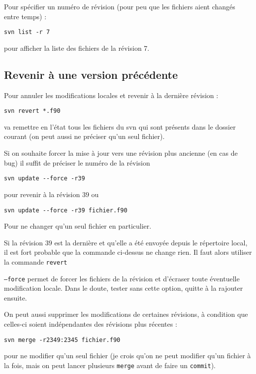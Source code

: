 \documentclass[a4paper,twoside]{article}
\begin{document}
Pour spécifier un numéro de révision (pour peu que les fichiers aient changés entre temps) : 
\begin{verbatim}
svn list -r 7
\end{verbatim}
pour afficher la liste des fichiers de la révision 7.

\subsection{Revenir à une version précédente} 
Pour annuler les modifications locales et revenir à la dernière révision : 
\begin{verbatim}
svn revert *.f90
\end{verbatim}
va remettre en l'état tous les fichiers du svn qui sont présents dans le dossier courant (on peut aussi ne préciser qu'un seul fichier).

\bigskip

Si on souhaite forcer la mise à jour vers une révision plus ancienne (en cas de bug) il suffit de préciser le numéro de la révision
\begin{verbatim}
svn update --force -r39
\end{verbatim}
pour revenir à la révision $39$ ou 
\begin{verbatim}
svn update --force -r39 fichier.f90
\end{verbatim}
Pour ne changer qu'un seul fichier en particulier.

\begin{remarque}
Si la révision $39$ est la dernière et qu'elle a été envoyée depuis le répertoire local, il est fort probable que la commande ci-dessus ne change rien. Il faut alors utiliser la commande \texttt{revert}

\texttt{--force} permet de forcer les fichiers de la révision et d'écraser toute éventuelle modification locale. Dans le doute, tester sans cette option, quitte à la rajouter ensuite.
\end{remarque}


\bigskip

On peut aussi supprimer les modifications de certaines révisions, à condition que celles-ci soient indépendantes des révisions plus récentes : 
\begin{verbatim}
svn merge -r2349:2345 fichier.f90
\end{verbatim}
pour ne modifier qu'un seul fichier (je crois qu'on ne peut modifier qu'un fichier à la fois, mais on peut lancer plusieurs \texttt{merge} avant de faire un \texttt{commit}).
\end{document}
